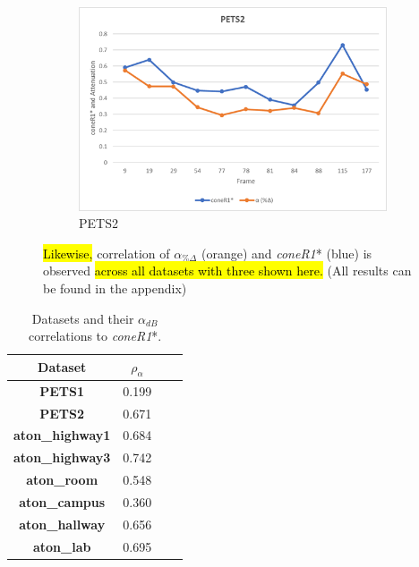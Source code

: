 \begin{figure}
\begin{subfigure}{.49\linewidth}
  \includegraphics[width=1\linewidth]{figures/pets2_rgb_corr.jpg}
  \caption{PETS2}
\end{subfigure}

\caption{\hl{Likewise,} correlation of $\alpha_{\%\Delta}$ (orange) and \textit{coneR1}* (blue) is observed \hl{across all datasets with three shown here.} (All results can be found in the appendix)}
\label{fig:corr_rgb}
\end{figure}

\begin{table}
\centering
\begin{tabular}{ |c|c|c|c| }
	\hline
	\textbf{Dataset} & \textbf{$\rho_{\alpha}$} \\
	\hline
	\hline
	\textbf{PETS1} & 0.199 \\
	\hline
	\textbf{PETS2} & 0.671 \\
	\hline
	\textbf{aton\_highway1} & 0.684 \\
	\hline
	\textbf{aton\_highway3} & 0.742 \\
	\hline
	\textbf{aton\_room} & 0.548 \\
	\hline
	\textbf{aton\_campus} & 0.360 \\
	\hline
	\textbf{aton\_hallway} & 0.656 \\
	\hline
	\textbf{aton\_lab} &  0.695 \\
	\hline
\end{tabular}
\caption{Datasets and their $\alpha_{dB}$ correlations to \textit{coneR1}*.}
\label{table:corr_db}
\end{table}

